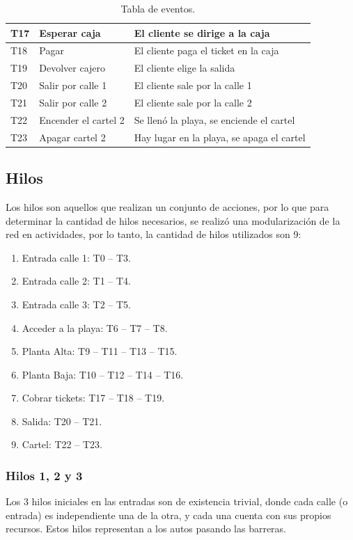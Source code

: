\documentclass[12pt,a4paper]{article}
\begin{document}
\begin{table}[H]
\begin{tabular}[width=15cm]{ || C{1.5cm} | L{5cm} | L{8.5cm} || }
	T17 & Esperar caja & El cliente se dirige a la caja  \\ \hline
	T18 & Pagar & El cliente paga el ticket en la caja  \\ \hline
	T19 & Devolver cajero & El cliente elige la salida \\ \hline
	T20 & Salir por calle 1 & El cliente sale por la calle 1  \\ \hline
	T21 & Salir por calle 2 & El cliente sale por la calle 2   \\ \hline
	T22 & Encender el cartel 2 & Se llenó la playa, se enciende el cartel   \\ \hline
	T23 & Apagar cartel 2 & Hay lugar en la playa, se apaga el cartel   \\ \hline
\end{tabular}
\caption{Tabla de eventos.}
\label{table:transiciones}
\end{table}

\subsection{Hilos}
 Los hilos son aquellos que realizan un conjunto de acciones, por lo que para determinar la cantidad de hilos necesarios, se realizó una modularización de la red en actividades, por lo tanto, la cantidad de hilos utilizados son 9:

\begin{enumerate}[leftmargin=1.5cm]
\item Entrada calle 1: T0 -- T3.
\item Entrada calle 2: T1 -- T4.
\item Entrada calle 3: T2 -- T5.
\item Acceder a la playa: T6 -- T7 -- T8.
\item Planta Alta: T9 -- T11 -- T13 -- T15.
\item Planta Baja: T10 -- T12 -- T14 -- T16.
\item Cobrar tickets: T17 -- T18 -- T19.
\item Salida: T20 -- T21.
\item Cartel: T22 -- T23.
\end{enumerate}

\subsubsection*{Hilos 1, 2 y 3}
Los 3 hilos iniciales en las entradas son de existencia trivial, donde cada calle (o entrada) es independiente una de la otra, y cada una cuenta con sus propios recursos. Estos hilos representan a los autos pasando las barreras.
\end{document}
